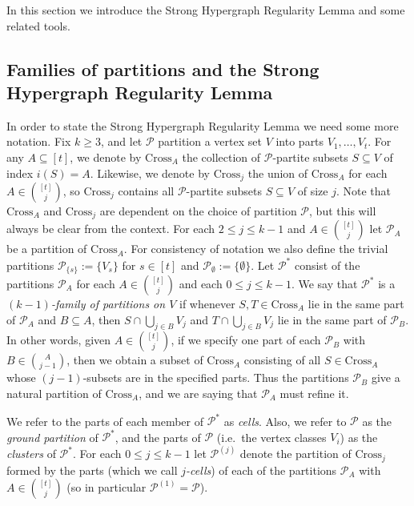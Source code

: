 \documentclass[12pt,a4paper]{amsart}
\newcommand{\Part}{\mathcal{P}}
\newcommand{\cross}{\textrm{Cross}}
\begin{document}
In this section we introduce the Strong Hypergraph Regularity Lemma and some related tools.

\subsection{Families of partitions and the Strong Hypergraph Regularity Lemma}
In order to state the Strong Hypergraph Regularity Lemma we need some more notation.
Fix $k \geq 3$, and let $\Part$ partition a vertex set $V$ into parts $V_1,
\dots, V_t$.
For any $A \subseteq [t]$, we denote by $\cross_A$ the
collection of $\Part$-partite subsets $S \subseteq V$ of index $i(S) = A$.
Likewise, we denote by $\cross_j$ the union of $\cross_A$ for each $A \in
\binom{[t]}{j}$, so $\cross_j$ contains all $\Part$-partite subsets $S
\subseteq V$ of size $j$. Note that $\cross_A$ and $\cross_j$ are dependent on 
the choice of partition $\Part$, but this will always be clear from the context.
For each $2 \leq j \leq k-1$ and $A \in \binom{[t]}{j}$ let $\Part_A$ be a
partition of $\cross_A$. For consistency of notation we also define the trivial partitions $\Part_{\{s\}} := \{V_s\}$ for $s \in [t]$ and $\Part_\emptyset := \{\emptyset\}$. Let $\Part^*$ consist of the partitions $\Part_A$ for each $A\in\binom{[t]}{j}$ and each $0 \le j\le k-1$. We say that $\Part^*$ is a \emph{$(k-1)$-family of partitions
on $V$} if whenever $S, T \in \cross_A$ lie in the same part of $\Part_A$ and $B
\subseteq A$, then $S \cap \bigcup_{j\in B} V_j$ and $T \cap
\bigcup_{j\in B} V_j$ lie in the same part of $\Part_B$. In other words, given $A \in \binom{[t]}{j}$, if we specify one part of each $\Part_B$ with $B \in \binom{A}{j-1}$, then we obtain a subset of $\cross_A$ consisting of all $S\in\cross_A$ whose $(j-1)$-subsets are in the specified parts. Thus the partitions $\Part_B$ give a natural partition of $\cross_A$, and we are saying that $\Part_A$ must refine it.


We refer to the parts
of each member of $\Part^*$ as \emph{cells}. Also, we refer to $\Part$ as the \emph{ground partition} of $\Part^*$, and the parts
of $\Part$ (i.e.~the vertex classes $V_i$) as the \emph{clusters} of $\Part^*$. For
each $0 \leq j \leq k-1$ let $\Part^{(j)}$ denote the partition of $\cross_j$
formed by the parts (which we call \emph{$j$-cells}) of each of the partitions 
$\Part_A$ with $A \in \binom{[t]}{j}$ (so in particular $\Part^{(1)} = \Part$).
\end{document}

